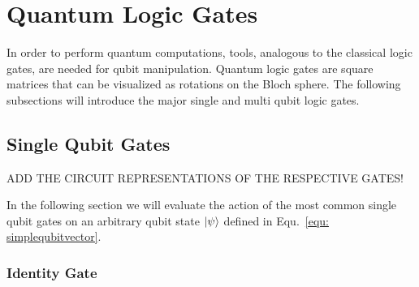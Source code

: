 

\section{Quantum Logic Gates}
\label{subsec:quantumlogicgates}
In order to perform quantum computations, tools, analogous to the classical logic gates, are needed for qubit manipulation. Quantum logic gates are square matrices that can be visualized as rotations on the Bloch sphere. The following subsections will introduce the major single and multi qubit logic gates.

\subsection{Single Qubit Gates}
\label{subsubsec:singlequbitgates}

ADD THE CIRCUIT REPRESENTATIONS OF THE RESPECTIVE GATES!

In the following section we will evaluate the action of the most common single qubit gates on an arbitrary qubit state $\ket{\psi}$ defined in Equ.~\ref{equ: simplequbitvector}.



\subsubsection{Identity Gate}
\label{subsubsubsec:identitygate}

